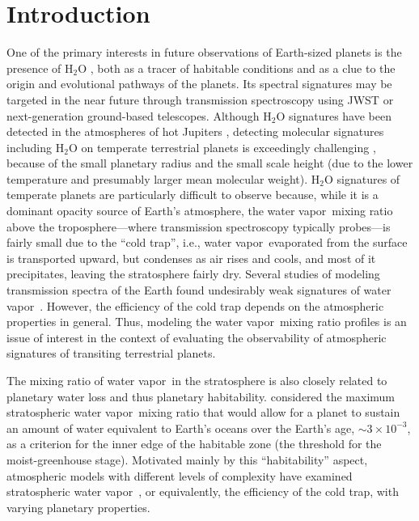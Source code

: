 \documentclass[11pt,numberedappendix,twocolappendix,]{emulateapj}
\def\water{H$_2$O }
\newcommand{\wv}{water vapor\ }
\begin{document}



\section{Introduction}
\label{s:intro}

One of the primary interests in future observations of Earth-sized planets is the presence of \water, both as a tracer of habitable conditions and as a clue to the origin and evolutional pathways of the planets. 
Its spectral signatures may be targeted in the near future through transmission spectroscopy using JWST or next-generation ground-based telescopes.
%
Although \water signatures have been detected in the atmospheres of hot Jupiters \citep[e.g.][]{Sing2016}, detecting molecular signatures including \water on temperate terrestrial planets is exceedingly challenging \citep{Cowan2015}, 
because of the small planetary radius and the small scale height (due to the lower temperature and presumably larger mean molecular weight).  
\water signatures of temperate planets are particularly difficult to observe because, while it is a dominant opacity source of Earth's atmosphere, the \wv  mixing ratio above the troposphere---where transmission spectroscopy typically probes---is fairly small due to the ``cold trap'', i.e., \wv evaporated from the surface is transported upward, but condenses as air rises and cools, and most of it precipitates, leaving the stratosphere fairly dry. 
Several studies of modeling transmission spectra of the Earth found undesirably weak signatures of \wv \citep[e.g.][]{Ehrenreich2006, Kaltenegger2009, Betremieux2013, Misra2014}. 
However, the efficiency of the cold trap depends on the atmospheric properties in general. 
Thus, modeling the \wv mixing ratio profiles is an issue of interest in the context of evaluating the observability of atmospheric signatures of transiting terrestrial planets. 

The mixing ratio of \wv in the stratosphere is also closely related to planetary water loss and thus planetary habitability. 
\citet{Kasting1993} considered the maximum stratospheric \wv mixing ratio that would allow for a planet to sustain an amount of water equivalent to Earth's oceans over the Earth's age, $\sim 3 \times 10^{-3}$, as a criterion for the inner edge of the habitable zone (the threshold for the moist-greenhouse stage). 
Motivated mainly by this ``habitability'' aspect, atmospheric models with different levels of complexity have examined stratospheric \wv, or equivalently, the efficiency of the cold trap, with varying planetary properties. 
\end{document}
